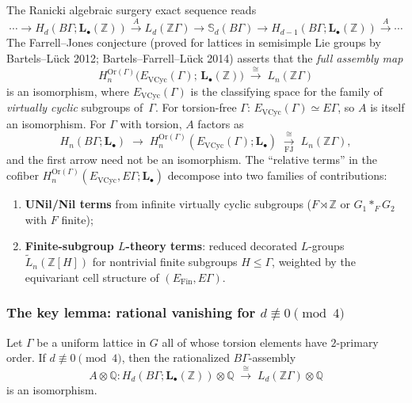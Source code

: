 The Ranicki algebraic surgery exact sequence reads
\begin{equation}\label{eq:q7-ranicki}
\cdots\to H_d(B\Gamma;\mathbf L_\bullet(\mathbb Z))
\xrightarrow{\;A\;} L_d(\mathbb Z\Gamma)
\to \mathbb S_d(B\Gamma)
\to H_{d-1}(B\Gamma;\mathbf L_\bullet(\mathbb Z))
\xrightarrow{\;A\;}\cdots
\end{equation}
The Farrell--Jones conjecture (proved for lattices in semisimple Lie groups by
Bartels--L\"uck 2012; Bartels--Farrell--L\"uck 2014) asserts that the
\emph{full assembly map}
\begin{equation}\label{eq:q7-full-FJ}
H_n^{\mathrm{Or}(\Gamma)}\bigl(E_{\mathrm{VCyc}}(\Gamma);\,\mathbf L_\bullet(\mathbb Z)\bigr)
\;\xrightarrow{\;\cong\;}\;
L_n(\mathbb Z\Gamma)
\end{equation}
is an isomorphism, where $E_{\mathrm{VCyc}}(\Gamma)$ is the classifying space for the
family of \emph{virtually cyclic} subgroups of~$\Gamma$.
For torsion-free $\Gamma$:
$E_{\mathrm{VCyc}}(\Gamma)\simeq E\Gamma$, so $A$ is itself an isomorphism.
For $\Gamma$ with torsion, $A$ factors as
\[
H_n(B\Gamma;\mathbf L_\bullet)
\;\longrightarrow\;
H_n^{\mathrm{Or}(\Gamma)}(E_{\mathrm{VCyc}}(\Gamma);\mathbf L_\bullet)
\;\xrightarrow[\text{FJ}]{\;\cong\;}\;
L_n(\mathbb Z\Gamma),
\]
and the first arrow need not be an isomorphism.
The ``relative terms'' in the cofiber
$H_n^{\mathrm{Or}(\Gamma)}(E_{\mathrm{VCyc}},E\Gamma;\mathbf L_\bullet)$
decompose into two families of contributions:
\begin{enumerate}[label=(\Roman*)]
\item \textbf{UNil/Nil terms} from infinite virtually cyclic subgroups
      ($F\rtimes\mathbb Z$ or $G_1\ast_F G_2$ with $F$ finite);
\item \textbf{Finite-subgroup $L$-theory terms}:
      reduced decorated $L$-groups $\widetilde L_n(\mathbb Z[H])$ for nontrivial
      finite subgroups $H\le\Gamma$, weighted by the equivariant cell structure
      of $(E_{\mathrm{Fin}},E\Gamma)$.
\end{enumerate}

\subsubsection*{The key lemma: rational vanishing for $d\not\equiv 0\pmod 4$}

\begin{lemma}\label{lem:q7-assembly}
Let $\Gamma$ be a uniform lattice in $G$ all of whose torsion elements have
$2$-primary order.
If\/ $d\not\equiv 0\pmod{4}$, then the rationalized $B\Gamma$-assembly
\begin{equation}\label{eq:q7-rational-assembly}
A\otimes\mathbb Q\colon
H_d(B\Gamma;\mathbf L_\bullet(\mathbb Z))\otimes\mathbb Q
\;\xrightarrow{\;\cong\;}\;
L_d(\mathbb Z\Gamma)\otimes\mathbb Q
\end{equation}
is an isomorphism.
\end{lemma}

